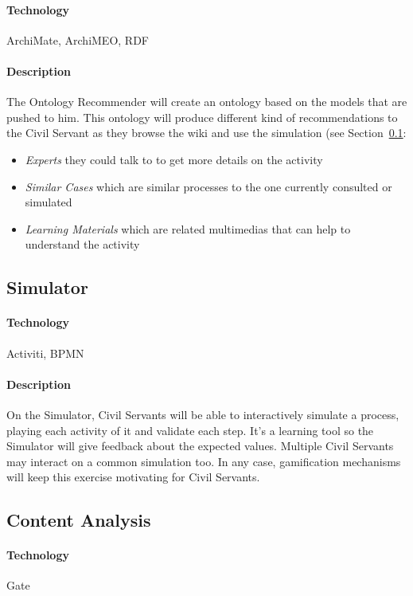 \documentclass{learnpad}
\begin{document}
\paragraph{Technology}
ArchiMate, ArchiMEO, RDF

\paragraph{Description}
The Ontology Recommender will create an ontology based on the models that are
pushed to him.  This ontology will produce different kind of recommendations to
the Civil Servant as they browse the wiki and use the simulation (see
Section~\ref{sec:simulator}:
\begin{itemize}
	\item \emph{Experts} they could talk to to get more details on the activity
	\item \emph{Similar Cases} which are similar processes to the one currently
		consulted or simulated
	\item \emph{Learning Materials} which are related
		multimedias that can help to understand the activity
\end{itemize}

\subsection{Simulator}
\label{sec:simulator}

\paragraph{Technology}
Activiti, BPMN

\paragraph{Description}
On the Simulator, Civil Servants will be able to interactively simulate a
process, playing each activity of it and validate each step.  It's a learning
tool so the Simulator will give feedback about the expected values.  Multiple
Civil Servants may interact on a common simulation too.  In any case,
gamification mechanisms will keep this exercise motivating for Civil Servants.

\subsection{Content Analysis}
\label{sec:content-analysis}

\paragraph{Technology}
Gate
\end{document}
